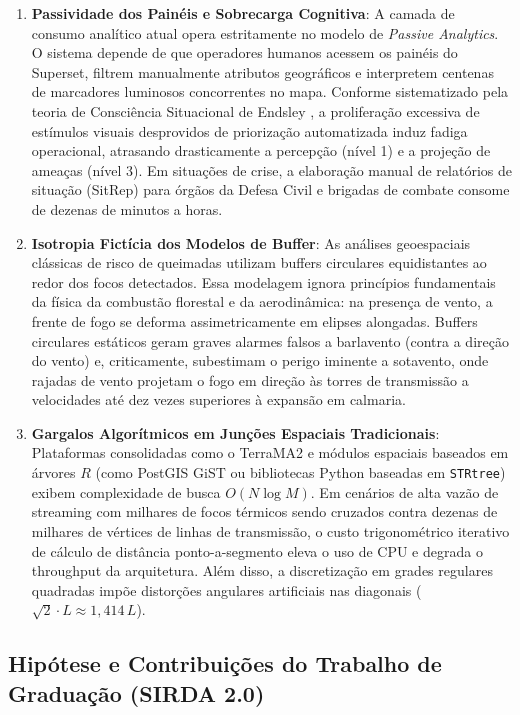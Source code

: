\begin{enumerate}
    \item \textbf{Passividade dos Painéis e Sobrecarga Cognitiva}: A camada de consumo analítico atual opera estritamente no modelo de \textit{Passive Analytics}. O sistema depende de que operadores humanos acessem os painéis do Superset, filtrem manualmente atributos geográficos e interpretem centenas de marcadores luminosos concorrentes no mapa. Conforme sistematizado pela teoria de Consciência Situacional de Endsley \cite{endsley1995toward}, a proliferação excessiva de estímulos visuais desprovidos de priorização automatizada induz fadiga operacional, atrasando drasticamente a percepção (nível 1) e a projeção de ameaças (nível 3). Em situações de crise, a elaboração manual de relatórios de situação (SitRep) para órgãos da Defesa Civil e brigadas de combate consome de dezenas de minutos a horas.
    \item \textbf{Isotropia Fictícia dos Modelos de Buffer}: As análises geoespaciais clássicas de risco de queimadas utilizam buffers circulares equidistantes ao redor dos focos detectados. Essa modelagem ignora princípios fundamentais da física da combustão florestal e da aerodinâmica: na presença de vento, a frente de fogo se deforma assimetricamente em elipses alongadas. Buffers circulares estáticos geram graves alarmes falsos a barlavento (contra a direção do vento) e, criticamente, subestimam o perigo iminente a sotavento, onde rajadas de vento projetam o fogo em direção às torres de transmissão a velocidades até dez vezes superiores à expansão em calmaria.
    \item \textbf{Gargalos Algorítmicos em Junções Espaciais Tradicionais}: Plataformas consolidadas como o TerraMA2 e módulos espaciais baseados em árvores $R$ (como PostGIS GiST ou bibliotecas Python baseadas em \texttt{STRtree}) exibem complexidade de busca $O(N \log M)$. Em cenários de alta vazão de streaming com milhares de focos térmicos sendo cruzados contra dezenas de milhares de vértices de linhas de transmissão, o custo trigonométrico iterativo de cálculo de distância ponto-a-segmento eleva o uso de CPU e degrada o throughput da arquitetura. Além disso, a discretização em grades regulares quadradas impõe distorções angulares artificiais nas diagonais ($\sqrt{2} \cdot L \approx 1,414\,L$).
\end{enumerate}

\subsection{Hipótese e Contribuições do Trabalho de Graduação (SIRDA 2.0)}
\label{sbc:hipotese_e_proposta}

